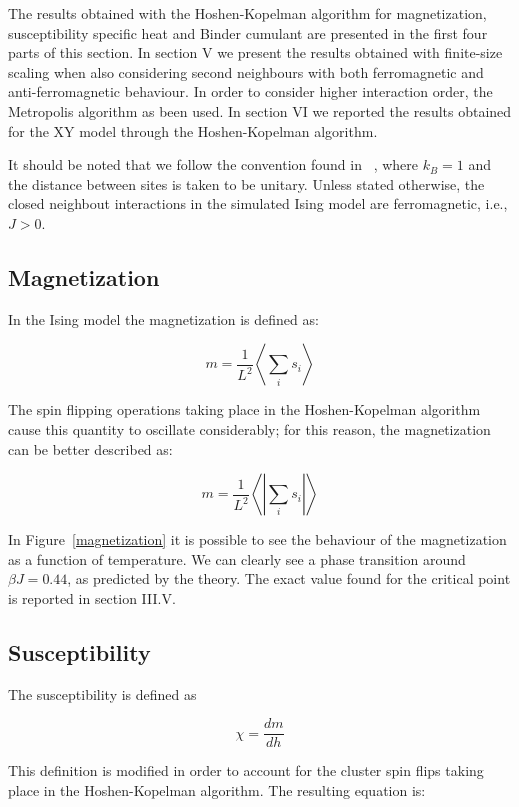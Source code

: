 \documentclass[twoside]{article}
\def\mean#1{\left< #1 \right>}
\begin{document}
\begin{multicols}{2}
The results obtained with the Hoshen-Kopelman algorithm for magnetization, susceptibility specific heat and Binder cumulant are presented in the first four parts of this section.
In section V we present the results obtained with finite-size scaling when also considering second neighbours with both ferromagnetic and anti-ferromagnetic behaviour. In order to consider higher interaction order, the Metropolis algorithm as been used.
In section VI we reported the results obtained for the XY model through the Hoshen-Kopelman algorithm.

It should be noted that we follow the convention found in ~\cite{thijssen}, where $k_B = 1$ and the distance between sites is taken to be unitary. Unless stated otherwise, the closed neighbout interactions in the simulated Ising model are ferromagnetic, i.e., $J > 0$.

\subsection{Magnetization}
In the Ising model the magnetization is defined as:

\begin{equation}
m = \frac{1}{L^2} \mean{\sum_i s_i}
\label{magnetization_conventional}
\end{equation}

The spin flipping operations taking place in the Hoshen-Kopelman algorithm cause this quantity to oscillate considerably; for this reason, the magnetization can be better described as:

\begin{equation}
m = \frac{1}{L^2} \mean{\left|\sum_i s_i\right|}
\end{equation}

In Figure~\ref{magnetization} it is possible to see the behaviour of the magnetization as a function of temperature. We can clearly see a phase transition around $\beta J = 0.44$, as predicted by the theory. The exact value found for the critical point is reported in section III.V.

\subsection{Susceptibility}
The susceptibility is defined as 

\begin{equation}
\chi = \frac{dm}{dh}
\end{equation}

This definition is modified in order to account for the cluster spin flips taking place in the Hoshen-Kopelman algorithm. The resulting equation is:


\end{multicols}
\end{document}
